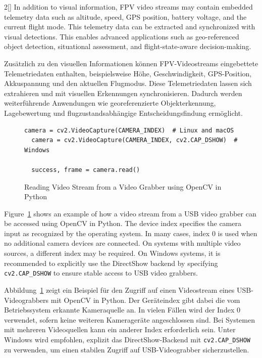 \begin{paracol}{2}[]
In addition to visual information, FPV video streams may contain embedded telemetry data such as altitude, speed, GPS position, battery voltage, and the current flight mode. This telemetry data can be extracted and synchronized with visual detections. This enables advanced applications such as geo-referenced object detection, situational assessment, and flight-state-aware decision-making.

\colger

Zusätzlich zu den visuellen Informationen können FPV-Videostreams eingebettete Telemetriedaten enthalten, beispielsweise Höhe, Geschwindigkeit, GPS-Position, Akkuspannung und den aktuellen Flugmodus. Diese Telemetriedaten lassen sich extrahieren und mit visuellen Erkennungen synchronisieren. Dadurch werden weiterführende Anwendungen wie georeferenzierte Objekterkennung, Lagebewertung und flugzustandsabhängige Entscheidungsfindung ermöglicht.

\colende


\begin{figure}
\begin{lstlisting}[style=shell]
  camera = cv2.VideoCapture(CAMERA_INDEX)  # Linux and macOS
  camera = cv2.VideoCapture(CAMERA_INDEX, cv2.CAP_DSHOW)  # Windows

  success, frame = camera.read()
\end{lstlisting}
\caption{Reading Video Stream from a Video Grabber using OpenCV in Python}
\label{ReadingUSBVideoStreamMitOpenCV}
\end{figure}
\FloatBarrier

\colstart

Figure~\ref{ReadingUSBVideoStreamMitOpenCV} shows an example of how a video stream from a USB video grabber can be accessed using OpenCV in Python. The device index specifies the camera input as recognized by the operating system. In many cases, index 0 is used when no additional camera devices are connected. On systems with multiple video sources, a different index may be required. On Windows systems, it is recommended to explicitly use the DirectShow backend by specifying \verb!cv2.CAP_DSHOW! to ensure stable access to USB video grabbers.

\colger

Abbildung~\ref{ReadingUSBVideoStreamMitOpenCV} zeigt ein Beispiel für den Zugriff auf einen Videostream eines USB-Videograbbers mit OpenCV in Python. Der Geräteindex gibt dabei die vom Betriebssystem erkannte Kameraquelle an. In vielen Fällen wird der Index 0 verwendet, sofern keine weiteren Kamerageräte angeschlossen sind. Bei Systemen mit mehreren Videoquellen kann ein anderer Index erforderlich sein. Unter Windows wird empfohlen, explizit das DirectShow-Backend mit \verb!cv2.CAP_DSHOW! zu verwenden, um einen stabilen Zugriff auf USB-Videograbber sicherzustellen.


\end{paracol}
